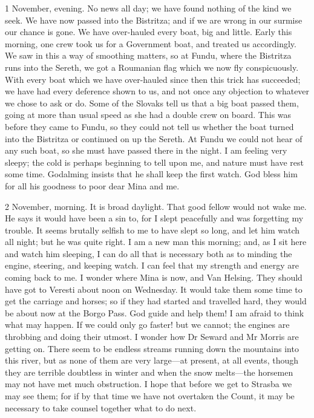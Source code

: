  

\begin{diary}{1 November, evening.}
No news all day; we have found nothing of the kind we seek. We have now passed into the Bistritza; and if we are wrong in our surmise our chance is gone. We have over-hauled every boat, big and little. Early this morning, one crew took us for a Government boat, and treated us accordingly. We saw in this a way of smoothing matters, so at Fundu, where the Bistritza runs into the Sereth, we got a Roumanian flag which we now fly conspicuously. With every boat which we have over-hauled since then this trick has succeeded; we have had every deference shown to us, and not once any objection to whatever we chose to ask or do. Some of the Slovaks tell us that a big boat passed them, going at more than usual speed as she had a double crew on board. This was before they came to Fundu, so they could not tell us whether the boat turned into the Bistritza or continued on up the Sereth. At Fundu we could not hear of any such boat, so she must have passed there in the night. I am feeling very sleepy; the cold is perhaps beginning to tell upon me, and nature must have rest some time. Godalming insists that he shall keep the first watch. God bless him for all his goodness to poor dear Mina and me.

 \end{diary}


\begin{diary}{2 November, morning.}
It is broad daylight. That good fellow would not wake me. He says it would have been a sin to, for I slept peacefully and was forgetting my trouble. It seems brutally selfish to me to have slept so long, and let him watch all night; but he was quite right. I am a new man this morning; and, as I sit here and watch him sleeping, I can do all that is necessary both as to minding the engine, steering, and keeping watch. I can feel that my strength and energy are coming back to me. I wonder where Mina is now, and Van Helsing. They should have got to Veresti about noon on Wednesday. It would take them some time to get the carriage and horses; so if they had started and travelled hard, they would be about now at the Borgo Pass. God guide and help them! I am afraid to think what may happen. If we could only go faster! but we cannot; the engines are throbbing and doing their utmost. I wonder how Dr Seward and Mr Morris are getting on. There seem to be endless streams running down the mountains into this river, but as none of them are very large—at present, at all events, though they are terrible doubtless in winter and when the snow melts—the horsemen may not have met much obstruction. I hope that before we get to Strasba we may see them; for if by that time we have not overtaken the Count, it may be necessary to take counsel together what to do next.
\end{diary}


